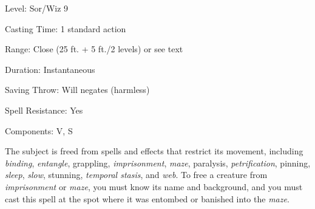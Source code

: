 
\begin{description*}
\item[Level:] Sor/Wiz 9
\item[Casting Time:] 1 standard action
\item[Range:] Close (25 ft. + 5 ft./2 levels) or see text
\item[Duration:] Instantaneous
\item[Saving Throw:] Will negates (harmless)
\item[Spell Resistance:] Yes
\item[Components:] V, S
\end{description*}

The subject is freed from spells and effects that restrict its movement, including
\textit{binding}, \textit{entangle}, grappling, \textit{imprisonment}, \textit{maze},
paralysis, \textit{petrification}, pinning, \textit{sleep}, \textit{slow}, stunning,
\textit{temporal stasis}, and \textit{web}. To free a creature from \textit{imprisonment
}or \textit{maze}, you must know its name and background, and you must cast this
spell at the spot where it was entombed or banished into the \textit{maze}.